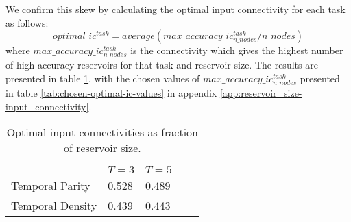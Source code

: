 \begin{figure*}[ht]
    \centering
    \caption{
        Plots of input connectivity against accuracy on TP3. Reservoir sizes $[40..70]$ are omitted for brevity.
        Note that the optimal input connectivity tends slightly to the right of the middle for all reservoir sizes.
        The omitted plots are presented in figures \ref{fig:TP3-IC-1} and \ref{fig:TP3-IC-2} in appendix \ref{app:reservoir_size-input_connectivity}.
        }
    \label{fig:TP3-IC}
    \resizebox{\textwidth}{!}{
        \subfloat[N=10]{
            
        }
        \subfloat[N=80]{
            
        }
    }
    \resizebox{\textwidth}{!}{
        \subfloat[N=20]{
            
        }
        \subfloat[N=90]{
            
        }
    }
    \resizebox{\textwidth}{!}{
        \subfloat[N=30]{
            
        }
        \subfloat[N=100]{
            
        }
    }
\end{figure*}

We confirm this skew by calculating the optimal input connectivity for each task as follows:
\begin{equation} \label{eq:optimal-ic}
optimal\_ic^{task} = average(max\_accuracy\_ic_{n\_nodes}^{task} / n\_nodes)
\end{equation}
where $ max\_accuracy\_ic_{n\_nodes}^{task} $ is the connectivity which gives the highest number of high-accuracy reservoirs for that task and reservoir size.
The results are presented in table \ref{tab:optimal-ic},
with the chosen values of $ max\_accuracy\_ic_{n\_nodes}^{task} $ presented in table \ref{tab:chosen-optimal-ic-values} in appendix \ref{app:reservoir_size-input_connectivity}.

\begin{table}[h]
    \centering
    \caption{Optimal input connectivities as fraction of reservoir size.}
    \label{tab:optimal-ic}
    \begin{tabular}{lllll}
                         & $T=3$          & $T=5$         \\
        Temporal Parity  & 0.528          & 0.489         \\
        Temporal Density & 0.439          & 0.443
    \end{tabular}
\end{table}

